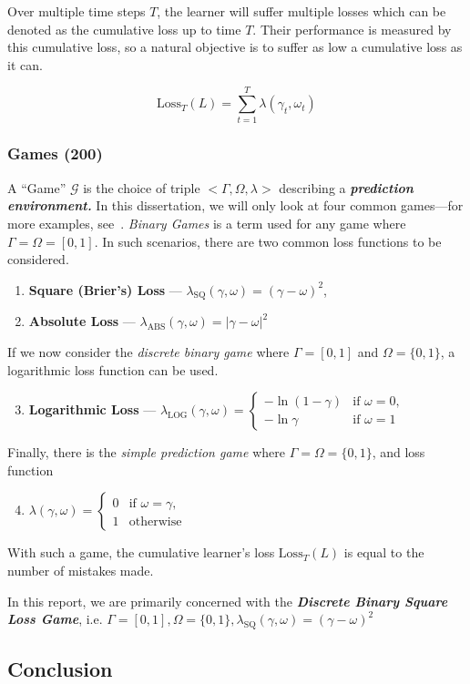 Over multiple time steps $T$, the learner will suffer multiple losses which can be denoted as the cumulative loss up to time $T$. Their performance is measured by this cumulative loss, so a natural objective is to suffer as low a cumulative loss as it can.

\begin{equation}
    \text{Loss}_T(L) = \underset{t=1}{\overset{T}{\sum}}\lambda(\gamma_t, \omega_t)
\end{equation}

\subsubsection*{Games (200)}
A ``Game'' $\mathcal{G}$  is the choice of triple $<\Gamma, \Omega, \lambda>$ describing a \textbf{\textit{prediction environment.}} In this dissertation, we will only look at four common games—for more examples, see~\cite{vovk:1998}. \textit{Binary Games} is a term used for any game where $\Gamma = \Omega = [0, 1]$. In such scenarios, there are two common loss functions to be considered.
\begin{enumerate}
    \item \textbf{Square (Brier's) Loss} — $\lambda_\text{SQ}(\gamma, \omega) = {(\gamma - \omega)}^2$,
    \item \textbf{Absolute Loss} — $\lambda_\text{ABS}(\gamma, \omega) = {|\gamma - \omega |}^2$
\end{enumerate}

If we now consider the \textit{discrete binary game} where $\Gamma = [0, 1]$ and $\Omega = \{0, 1\}$, a logarithmic loss function can be used.
\begin{enumerate}
    \setcounter{enumi}{2}
    \item \textbf{Logarithmic Loss} — $\lambda_\text{LOG}(\gamma, \omega)=\begin{cases}-\ln(1-\gamma)&\text{if }\omega=0,\\-\ln\gamma&\text{if }\omega=1\end{cases}$
\end{enumerate}

Finally, there is the \textit{simple prediction game} where $\Gamma = \Omega = \{0, 1\}$, and loss function
\begin{enumerate}
\setcounter{enumi}{3}
    \item $\lambda(\gamma, \omega) = \begin{cases}0&\text{if }\omega=\gamma,\\1&\text{otherwise}\end{cases}$
\end{enumerate}

With such a game, the cumulative learner's loss $\text{Loss}_T(L)$ is equal to the number of mistakes made.

In this report, we are primarily concerned with the \textbf{\textit{Discrete Binary Square Loss Game}}, i.e. $\Gamma = [0, 1], \Omega = \{0, 1\}, \lambda_\text{SQ}(\gamma, \omega) = {(\gamma - \omega)}^2$

\subsection{Conclusion}